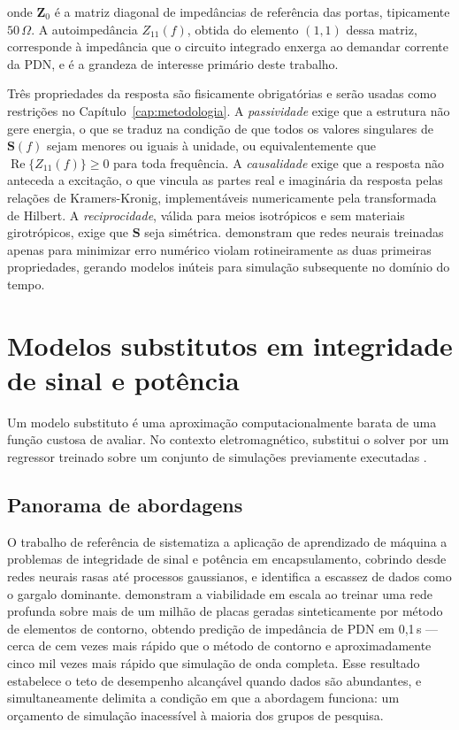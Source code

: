 \noindent onde $\mathbf{Z}_0$ é a matriz diagonal de impedâncias de referência
das portas, tipicamente $50\,\Omega$. A autoimpedância $Z_{11}(f)$, obtida do
elemento $(1,1)$ dessa matriz, corresponde à impedância que o circuito integrado
enxerga ao demandar corrente da PDN, e é a grandeza de interesse primário deste
trabalho.

Três propriedades da resposta são fisicamente obrigatórias e serão usadas como
restrições no Capítulo~\ref{cap:metodologia}. A \emph{passividade} exige que a
estrutura não gere energia, o que se traduz na condição de que todos os valores
singulares de $\mathbf{S}(f)$ sejam menores ou iguais à unidade, ou
equivalentemente que $\operatorname{Re}\{Z_{11}(f)\} \geq 0$ para toda
frequência. A \emph{causalidade} exige que a resposta não anteceda a excitação, o
que vincula as partes real e imaginária da resposta pelas relações de
Kramers-Kronig, implementáveis numericamente pela transformada de Hilbert. A
\emph{reciprocidade}, válida para meios isotrópicos e sem materiais girotrópicos,
exige que $\mathbf{S}$ seja simétrica. \citet{torun2020} demonstram que
redes neurais treinadas apenas para minimizar erro numérico violam rotineiramente
as duas primeiras propriedades, gerando modelos inúteis para simulação
subsequente no domínio do tempo.

\section{Modelos substitutos em integridade de sinal e potência}
\label{sec:surrogate}

Um modelo substituto é uma aproximação computacionalmente barata de uma função
custosa de avaliar. No contexto eletromagnético, substitui o solver por um
regressor treinado sobre um conjunto de simulações previamente executadas
\citep{swaminathan2020}.

\subsection{Panorama de abordagens}

O trabalho de referência de \citet{swaminathan2020} sistematiza a aplicação de
aprendizado de máquina a problemas de integridade de sinal e potência em
encapsulamento, cobrindo desde redes neurais rasas até processos gaussianos, e
identifica a escassez de dados como o gargalo dominante. \citet{zhang2021}
demonstram a viabilidade em escala ao treinar uma rede profunda sobre mais de um
milhão de placas geradas sinteticamente por método de elementos de contorno,
obtendo predição de impedância de PDN em 0,1\,s — cerca de cem vezes mais rápido
que o método de contorno e aproximadamente cinco mil vezes mais rápido que
simulação de onda completa. Esse resultado estabelece o teto de desempenho
alcançável quando dados são abundantes, e simultaneamente delimita a condição em
que a abordagem funciona: um orçamento de simulação inacessível à maioria dos
grupos de pesquisa.

